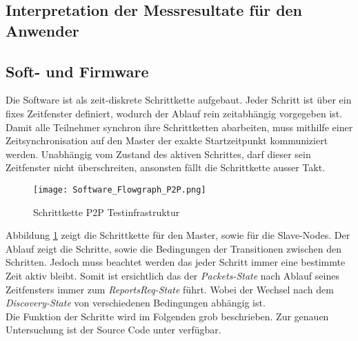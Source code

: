 \subsection{Interpretation der Messresultate für den Anwender}\label{sec:InterpretationderMessresultatefürdenAnwender}

\subsection{Soft- und Firmware}\label{sec:SoftundFirmware}

Die Software ist als zeit-diskrete Schrittkette aufgebaut. Jeder Schritt ist über ein fixes Zeitfenster definiert, wodurch der Ablauf rein zeitabhängig vorgegeben ist. Damit alle Teilnehmer synchron ihre Schrittketten abarbeiten, muss mithilfe einer Zeitsynchronisation auf den Master der exakte Startzeitpunkt kommuniziert werden. Unabhängig vom Zustand des aktiven Schrittes, darf dieser sein Zeitfenster nicht überschreiten, ansonsten fällt die Schrittkette ausser Takt. 

\begin{figure} [H]
	\centering
	\texttt{[image: Software\_Flowgraph\_P2P.png]}
	\caption{Schrittkette P2P Testinfrastruktur}
	\label{fig:FlowgraphP2P}
\end{figure}

Abbildung \ref{fig:FlowgraphP2P} zeigt die Schrittkette für den Master, sowie für die Slave-Nodes. Der Ablauf zeigt die Schritte, sowie die Bedingungen der Transitionen zwischen den Schritten. Jedoch muss beachtet werden das jeder Schritt immer eine bestimmte Zeit aktiv bleibt. Somit ist ersichtlich das der \textit{Packets-State} nach Ablauf seines Zeitfensters immer zum \textit{ReportsReq-State} führt. Wobei der Wechsel nach dem \textit{Discovery-State} von verschiedenen Bedingungen abhängig ist. \\

Die Funktion der Schritte wird im Folgenden grob beschrieben. Zur genauen Untersuchung ist der Source Code unter \cite{github_p6_software_p2p_2020} verfügbar.  \\

